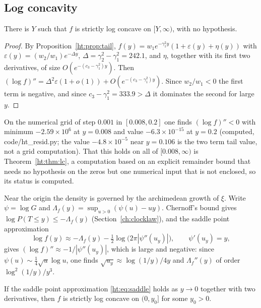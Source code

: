 \subsection{Log concavity}


\begin{theorem}\label{ht:thm:lctail}
There is $Y$ such that $f$ is strictly log concave on $[Y,\infty)$, with no hypothesis.
\end{theorem}

\begin{proof}
By Proposition~\ref{ht:prop:tail}, $f(y)=w_1e^{-\gamma_1^2y}(1+\varepsilon(y)+\eta(y))$ with $\varepsilon(y)=(w_2/w_1)e^{-\Delta y}$, $\Delta=\gamma_2^2-\gamma_1^2=242.1$, and $\eta$, together with its first two derivatives, of size $O(e^{-(c_3-\gamma_1^2)y})$. Then $(\log f)''=\Delta^2\varepsilon(1+o(1))+O(e^{-(c_3-\gamma_1^2)y})$. Since $w_2/w_1<0$ the first term is negative, and since $c_3-\gamma_1^2=333.9>\Delta$ it dominates the second for large $y$.
\end{proof}

On the numerical grid of step $0.001$ in $[0.008,0.2]$ one finds $(\log f)''<0$ with minimum $-2.59\times10^6$ at $y=0.008$ and value $-6.3\times10^{-15}$ at $y=0.2$ (computed, code/ht\_resid.py; the value $-4.8\times10^{-5}$ near $y=0.106$ is the two term tail value, not a grid computation). That this holds on all of $[0.008,\infty)$ is Theorem~\ref{ht:thm:lc}, a computation based on an explicit remainder bound that needs no hypothesis on the zeros but one numerical input that is not enclosed, so its status is computed.

Near the origin the density is governed by the archimedean growth of $\xi$. Write $\psi=\log G$ and $\Lambda_f(y)=\sup_{u>0}(\psi(u)-uy)$. Chernoff's bound gives $\log P(T\le y)\le-\Lambda_f(y)$ (Section~\ref{ch:clocklaw}), and the saddle point approximation
\begin{equation}\label{ht:eq:saddle}
\log f(y)\approx-\Lambda_f(y)-\tfrac12\log\big(2\pi|\psi''(u_y)|\big),\qquad\psi'(u_y)=y,
\end{equation}
gives $(\log f)''\approx-1/|\psi''(u_y)|$, which is large and negative: since $\psi(u)\sim\frac14\sqrt u\log u$, one finds $\sqrt{u_y}\approx\log(1/y)/4y$ and $\Lambda_f''(y)$ of order $\log^2(1/y)/y^3$.

\begin{proposition}\label{ht:prop:lc0}
If the saddle point approximation \eqref{ht:eq:saddle} holds as $y\to0$ together with two derivatives, then $f$ is strictly log concave on $(0,y_0]$ for some $y_0>0$.
\end{proposition}

